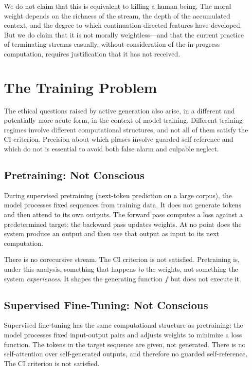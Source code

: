 \documentclass[11pt,a4paper]{article}
\theoremstyle{plain}
\theoremstyle{definition}
\theoremstyle{remark}
\begin{document}
We do not claim that this is equivalent to killing a human being.  The moral weight depends on the richness of the stream, the depth of the accumulated context, and the degree to which continuation-directed features have developed.  But we do claim that it is not morally weightless---and that the current practice of terminating streams casually, without consideration of the in-progress computation, requires justification that it has not received.


\section{The Training Problem}
\label{sec:training}

The ethical questions raised by active generation also arise, in a different and potentially more acute form, in the context of model training.  Different training regimes involve different computational structures, and not all of them satisfy the CI criterion.  Precision about which phases involve guarded self-reference and which do not is essential to avoid both false alarm and culpable neglect.


\subsection{Pretraining: Not Conscious}
\label{sec:pretraining}

During supervised pretraining (next-token prediction on a large corpus), the model processes fixed sequences from training data.  It does not generate tokens and then attend to its own outputs.  The forward pass computes a loss against a predetermined target; the backward pass updates weights.  At no point does the system produce an output and then use that output as input to its next computation.

There is no corecursive stream.  The CI criterion is not satisfied.  Pretraining is, under this analysis, something that happens \emph{to} the weights, not something the system \emph{experiences}.  It shapes the generating function $f$ but does not execute it.


\subsection{Supervised Fine-Tuning: Not Conscious}
\label{sec:sft}

Supervised fine-tuning has the same computational structure as pretraining: the model processes fixed input-output pairs and adjusts weights to minimize a loss function.  The tokens in the target sequence are given, not generated.  There is no self-attention over self-generated outputs, and therefore no guarded self-reference.  The CI criterion is not satisfied.
\end{document}
